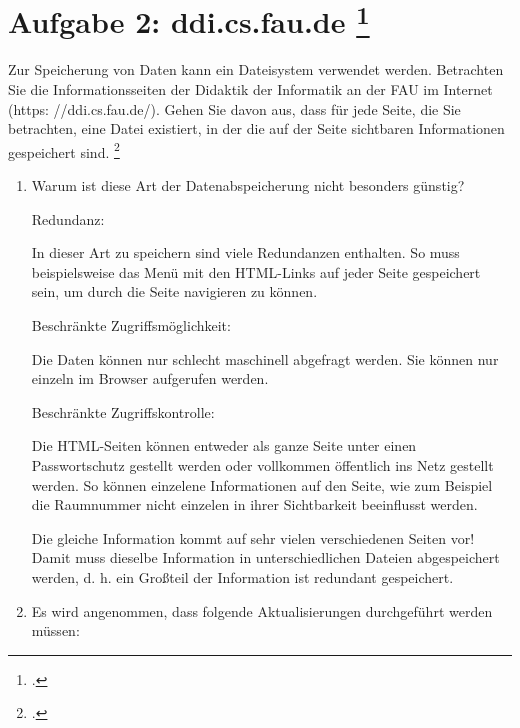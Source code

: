 \documentclass{lehramt-informatik-aufgabe}
\begin{document}

\section{Aufgabe 2: ddi.cs.fau.de
\footcite[Seite 1]{db:ab:1}}

Zur Speicherung von Daten kann ein Dateisystem verwendet werden.
Betrachten Sie die Informationsseiten der Didaktik der Informatik an der
FAU im Internet (https: //ddi.cs.fau.de/). Gehen Sie davon aus, dass für
jede Seite, die Sie betrachten, eine Datei existiert, in der die auf der
Seite sichtbaren Informationen gespeichert sind.
\footcite[Seite 19-20]{winter}

\begin{enumerate}


\item Warum ist diese Art der Datenabspeicherung nicht besonders
günstig?

\begin{liAntwort}
Redundanz:

In dieser Art zu speichern sind viele Redundanzen enthalten. So muss
beispielsweise das Menü mit den HTML-Links auf jeder Seite gespeichert
sein, um durch die Seite navigieren zu können.

Beschränkte Zugriffsmöglichkeit:

Die Daten können nur
schlecht maschinell abgefragt werden. Sie können nur einzeln im Browser
aufgerufen werden.

Beschränkte Zugriffskontrolle:

Die HTML-Seiten können entweder als ganze Seite unter einen
Passwortschutz gestellt werden oder vollkommen öffentlich ins Netz
gestellt werden. So können einzelene Informationen auf den Seite, wie
zum Beispiel die Raumnummer nicht einzelen in ihrer Sichtbarkeit
beeinflusst werden.
\end{liAntwort}

\begin{liAntwort}
Die gleiche Information kommt auf sehr vielen verschiedenen Seiten vor!
Damit muss dieselbe Information in unterschiedlichen Dateien
abgespeichert werden, d. h. ein Großteil der Information ist redundant
gespeichert.
\end{liAntwort}


\item Es wird angenommen, dass folgende Aktualisierungen durchgeführt
werden müssen:


\end{enumerate}
\end{document}
